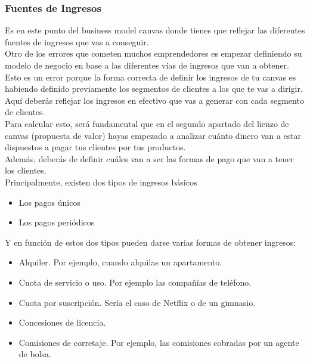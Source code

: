 \documentclass[preprint,12pt]{elsarticle}
\begin{document}
\subsubsection{Fuentes de Ingresos}

Es en este punto del business model canvas donde tienes que reflejar las diferentes fuentes de ingresos que vas a conseguir. \\

Otro de los errores que cometen muchos emprendedores es empezar definiendo su modelo de negocio en base a las diferentes vías de ingresos que van a obtener.\\

Esto es un error porque la forma correcta de definir los ingresos de tu canvas es habiendo definido previamente los segmentos de clientes a los que te vas a dirigir.\\

Aquí deberás reflejar los ingresos en efectivo que vas a generar con cada segmento de clientes.\\

Para calcular esto, será fundamental que en el segundo apartado del lienzo de canvas (propuesta de valor) hayas empezado a analizar cuánto dinero van a estar dispuestos a pagar tus clientes por tus productos.\\

Además, deberás de definir cuáles van a ser las formas de pago que van a tener los clientes.\\

Principalmente, existen dos tipos de ingresos básicos\\
\begin{itemize}
\item Los pagos únicos
\item Los pagos periódicos
\end{itemize}
Y en función de estos dos tipos pueden darse varias formas de obtener ingresos:\\
\begin{itemize}
\item Alquiler. Por ejemplo, cuando alquilas un apartamento.
\item Cuota de servicio o uso. Por ejemplo las compañías de teléfono.
\item Cuota por suscripción. Sería el caso de Netflix o de un gimnasio.
\item Concesiones de licencia.
\item Comisiones de corretaje. Por ejemplo, las comisiones cobradas por un agente de bolsa.
\end{itemize}
\end{document}
